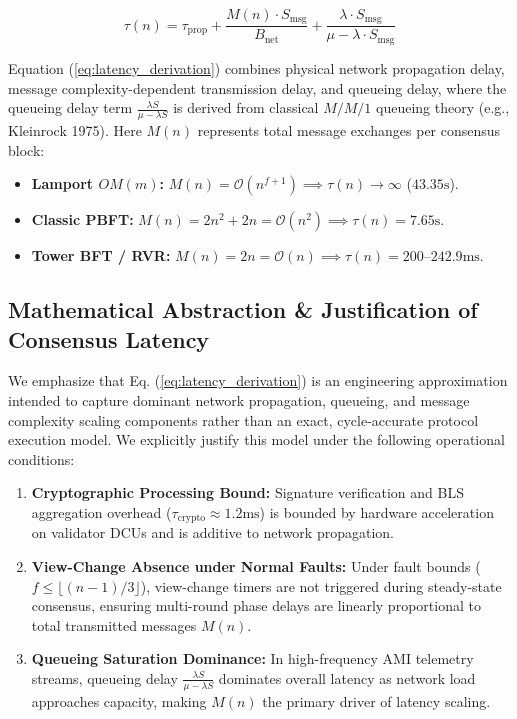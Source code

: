 \documentclass[10pt,twocolumn,journal]{IEEEtran}
\begin{document}
\begin{equation}
\tau(n) = \tau_{\text{prop}} + \frac{M(n) \cdot S_{\text{msg}}}{B_{\text{net}}} + \frac{\lambda \cdot S_{\text{msg}}}{\mu - \lambda \cdot S_{\text{msg}}}
\label{eq:latency_derivation}
\end{equation}

Equation (\ref{eq:latency_derivation}) combines physical network propagation delay, message complexity-dependent transmission delay, and queueing delay, where the queueing delay term $\frac{\lambda S}{\mu - \lambda S}$ is derived from classical $M/M/1$ queueing theory (e.g., Kleinrock 1975). Here $M(n)$ represents total message exchanges per consensus block:
\begin{itemize}[leftmargin=*]
    \item \textbf{Lamport $OM(m)$:} $M(n) = \mathcal{O}(n^{f+1}) \implies \tau(n) \to \infty$ ($43.35\text{s}$).
    \item \textbf{Classic PBFT:} $M(n) = 2n^2 + 2n = \mathcal{O}(n^2) \implies \tau(n) = 7.65\text{s}$.
    \item \textbf{Tower BFT / RVR:} $M(n) = 2n = \mathcal{O}(n) \implies \tau(n) = 200\text{--}242.9\text{ms}$.
\end{itemize}

\subsection{Mathematical Abstraction & Justification of Consensus Latency}
We emphasize that Eq. (\ref{eq:latency_derivation}) is an engineering approximation intended to capture dominant network propagation, queueing, and message complexity scaling components rather than an exact, cycle-accurate protocol execution model. We explicitly justify this model under the following operational conditions:
\begin{enumerate}[leftmargin=*]
    \item \textbf{Cryptographic Processing Bound:} Signature verification and BLS aggregation overhead ($\tau_{\text{crypto}} \approx 1.2\text{ms}$) is bounded by hardware acceleration on validator DCUs and is additive to network propagation.
    \item \textbf{View-Change Absence under Normal Faults:} Under fault bounds ($f \le \lfloor(n-1)/3\rfloor$), view-change timers are not triggered during steady-state consensus, ensuring multi-round phase delays are linearly proportional to total transmitted messages $M(n)$.
    \item \textbf{Queueing Saturation Dominance:} In high-frequency AMI telemetry streams, queueing delay $\frac{\lambda S}{\mu - \lambda S}$ dominates overall latency as network load approaches capacity, making $M(n)$ the primary driver of latency scaling.
\end{enumerate}
\end{document}
